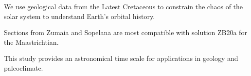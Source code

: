\documentclass[]{agujournal2019}
\begin{document}

\begin{keypoints}
\item We use geological data from the Latest Cretaceous to constrain the chaos of the solar system to understand Earth's orbital history.
\item Sections from Zumaia and Sopelana are most compatible with solution ZB20a for the Maastrichtian.
\item This study provides an astronomical time scale for applications in geology and paleoclimate.
\end{keypoints}

%
%

%
%

\end{document}
